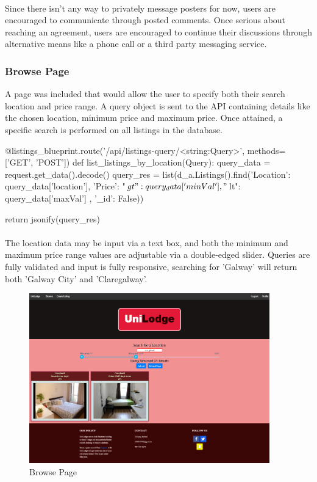 \paragraph{}
Since there isn't any way to privately message posters for now, users are encouraged to communicate through posted comments. Once serious about reaching an agreement, users are encouraged to continue their discussions through alternative means like a phone call or a third party messaging service.

\subsubsection{Browse Page}
A page was included that would allow the user to specify both their search location and price range. A query object is sent to the API containing details like the chosen location, minimum price and maximum price. Once attained, a specific search is performed on all listings in the database. \newline

\begin{python}[caption=Querying Specific Listings]
@listings_blueprint.route('/api/listings-query/<string:Query>', methods=['GET', 'POST'])
def list_listings_by_location(Query):
    query_data = request.get_data().decode()
    query_res = list(d_a.Listings().find({'Location': query_data['location'], 'Price': {"$gt": query_data['minVal'], "$lt": query_data['maxVal']} }, {'_id': False}))

    return jsonify(query_res)
\end{python}

\paragraph{}
The location data may be input via a text box, and both the minimum and maximum price range values are adjustable via a double-edged slider. Queries are fully validated and input is fully responsive, searching for 'Galway' will return both 'Galway City' and 'Claregalway'.

\begin{figure}[H]
	\caption{Browse Page}
	\label{image:browse}
	\centering
	\includegraphics[width=0.93\textwidth]{images/browse.png}
\end{figure}

